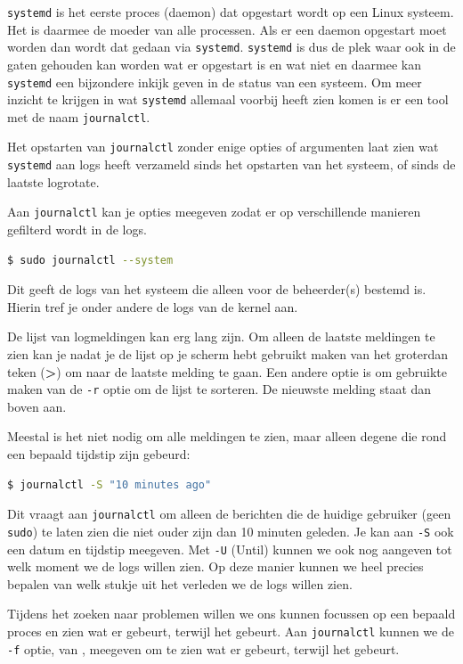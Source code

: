 \texttt{systemd} is het eerste proces (daemon) dat opgestart wordt op een Linux systeem. Het is daarmee de moeder van alle processen. Als er een daemon opgestart moet worden dan wordt dat gedaan via \texttt{systemd}. \texttt{systemd} is dus de plek waar ook in de gaten gehouden kan worden wat er opgestart is en wat niet en daarmee kan \texttt{systemd} een bijzondere inkijk geven in de status van een systeem. Om meer inzicht te krijgen in wat \texttt{systemd} allemaal voorbij heeft zien komen is er een tool met de naam \texttt{journalctl}.

Het opstarten van \texttt{journalctl} zonder enige opties of argumenten laat zien wat \texttt{systemd} aan logs heeft verzameld sinds het opstarten van het systeem, of sinds de laatste logrotate.

Aan \texttt{journalctl} kan je opties meegeven zodat er op verschillende manieren gefilterd wordt in de logs.
\begin{lstlisting}[language=bash]
$ sudo journalctl --system
\end{lstlisting}
Dit geeft de logs van het systeem die alleen voor de beheerder(s) bestemd is. Hierin tref je onder andere de logs van de kernel aan.

De lijst van logmeldingen kan erg lang zijn. Om alleen de laatste meldingen te zien kan je nadat je de lijst op je scherm hebt gebruikt maken van het groterdan teken (\textbf{>}) om naar de laatste melding te gaan. Een andere optie is om gebruikte maken van de \texttt{-r} optie om de lijst  te sorteren. De nieuwste melding staat dan boven aan.

Meestal is het niet nodig om alle meldingen te zien, maar alleen degene die rond een bepaald tijdstip zijn gebeurd:
\begin{lstlisting}[language=bash]
$ journalctl -S "10 minutes ago"
\end{lstlisting}
Dit vraagt aan \texttt{journalctl} om alleen de berichten die de huidige gebruiker (geen \texttt{sudo}) te laten zien die niet ouder zijn dan 10 minuten geleden. Je kan aan \texttt{-S} ook een datum en tijdstip meegeven. Met \texttt{-U} (Until) kunnen we ook nog aangeven tot welk moment we de logs willen zien. Op deze manier kunnen we heel precies bepalen van welk stukje uit het verleden we de logs willen zien.

Tijdens het zoeken naar problemen willen we ons kunnen focussen op een bepaald proces en zien wat er gebeurt, terwijl het gebeurt. Aan \texttt{journalctl} kunnen we de \texttt{-f} optie, van , meegeven om te zien wat er gebeurt, terwijl het gebeurt.

